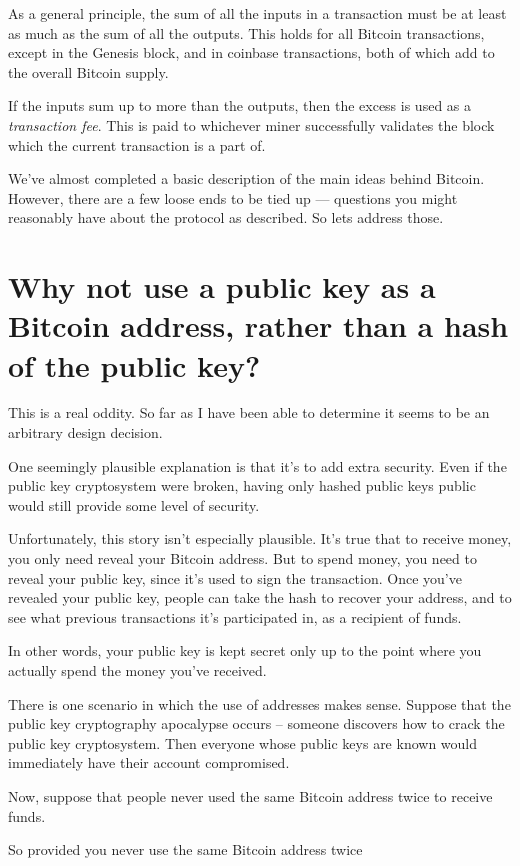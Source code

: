 \documentclass[12pt]{book}
\begin{document}
As a general principle, the sum of all the inputs in a transaction
must be at least as much as the sum of all the outputs.  This holds
for all Bitcoin transactions, except in the Genesis block, and in
coinbase transactions, both of which add to the overall Bitcoin
supply.

If the inputs sum up to more than the outputs, then the excess is used
as a \emph{transaction fee}.  This is paid to whichever miner
successfully validates the block which the current transaction is a
part of.

We've almost completed a basic description of the main ideas behind
Bitcoin.  However, there are a few loose ends to be tied up ---
questions you might reasonably have about the protocol as described.
So lets address those.

\section{Why not use a public key as a Bitcoin address, rather than a
  hash of the public key?}

This is a real oddity.  So far as I have been able to determine it
seems to be an arbitrary design decision.

One seemingly plausible explanation is that it's to add extra
security.  Even if the public key cryptosystem were broken, having
only hashed public keys public would still provide some level of
security.

Unfortunately, this story isn't especially plausible.  It's true that
to receive money, you only need reveal your Bitcoin address.  But to
spend money, you need to reveal your public key, since it's used to
sign the transaction.  Once you've revealed your public key, people
can take the hash to recover your address, and to see what previous
transactions it's participated in, as a recipient of funds.

In other words, your public key is kept secret only up to the point
where you actually spend the money you've received.

There is one scenario in which the use of addresses makes sense.
Suppose that the public key cryptography apocalypse occurs -- someone
discovers how to crack the public key cryptosystem.  Then everyone
whose public keys are known would immediately have their account
compromised.

Now, suppose that people never used the same Bitcoin address twice to
receive funds.

So provided you never use the same Bitcoin address twice
\end{document}
